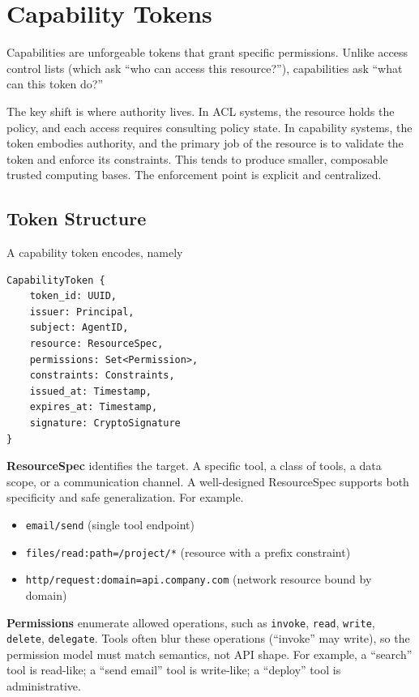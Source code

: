 \section{Capability Tokens}

Capabilities are unforgeable tokens that grant specific permissions. Unlike access control lists (which ask ``who can access this resource?''), capabilities ask ``what can this token do?''

The key shift is where authority lives. In ACL systems, the resource holds the policy, and each access requires consulting policy state. In capability systems, the token embodies authority, and the primary job of the resource is to validate the token and enforce its constraints. This tends to produce smaller, composable trusted computing bases. The enforcement point is explicit and centralized.

\subsection{Token Structure}

A capability token encodes, namely \begin{verbatim}
CapabilityToken {
    token_id: UUID,
    issuer: Principal,
    subject: AgentID,
    resource: ResourceSpec,
    permissions: Set<Permission>,
    constraints: Constraints,
    issued_at: Timestamp,
    expires_at: Timestamp,
    signature: CryptoSignature
}
\end{verbatim}

\textbf{ResourceSpec} identifies the target. A specific tool, a class of tools, a data scope, or a communication channel. A well-designed ResourceSpec supports both specificity and safe generalization. For example.
\begin{itemize}
\item \texttt{email/send} (single tool endpoint)
\item \texttt{files/read:path=/project/*} (resource with a prefix constraint)
\item \texttt{http/request:domain=api.company.com} (network resource bound by domain)
\end{itemize}

\textbf{Permissions} enumerate allowed operations, such as \texttt{invoke}, \texttt{read}, \texttt{write}, \texttt{delete}, \texttt{delegate}. Tools often blur these operations (``invoke'' may write), so the permission model must match semantics, not API shape. For example, a ``search'' tool is read-like; a ``send email'' tool is write-like; a ``deploy'' tool is administrative.

